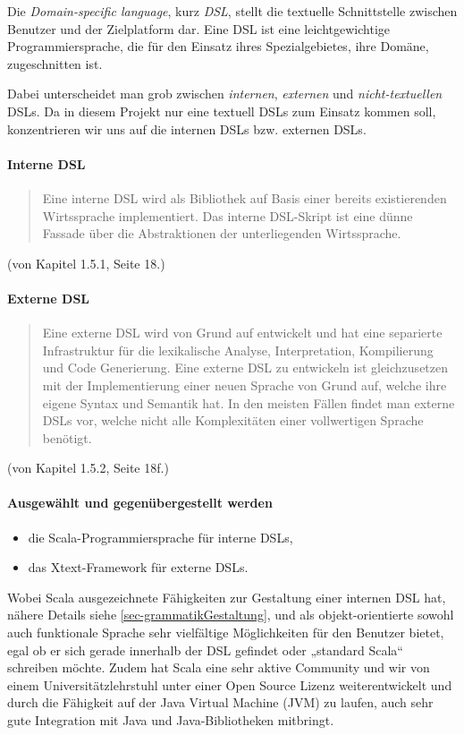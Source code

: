 Die \emph{Domain-specific language}, kurz \emph{DSL}, stellt die
textuelle Schnittstelle zwischen Benutzer und der Zielplatform dar.
Eine DSL ist eine leichtgewichtige Programmiersprache, die für den
Einsatz ihres Spezialgebietes, ihre Domäne, zugeschnitten ist.

Dabei unterscheidet man grob zwischen \emph{internen}, \emph{externen}
und \emph{nicht-textuellen} DSLs.\cite{dsls} Da in diesem Projekt
nur eine textuell DSLs zum Einsatz kommen soll, konzentrieren wir uns
auf die internen DSLs bzw. externen DSLs.

\paragraph{Interne DSL}
\begin{quote}
Eine interne DSL wird als Bibliothek auf Basis
einer bereits existierenden Wirtssprache implementiert. Das interne DSL-Skript
ist eine dünne Fassade über die Abstraktionen der unterliegenden Wirtssprache.
\end{quote} (von \cite{dsls} Kapitel 1.5.1, Seite 18.)

\paragraph{Externe DSL}
\begin{quote}
Eine externe DSL wird von Grund auf entwickelt und hat eine separierte
Infrastruktur für die lexikalische Analyse, Interpretation, Kompilierung
und Code Generierung. Eine externe DSL zu entwickeln ist gleichzusetzen mit
der Implementierung einer neuen Sprache von Grund auf, welche ihre eigene
Syntax und Semantik hat.
In den meisten Fällen findet man externe DSLs vor, welche nicht alle
Komplexitäten einer vollwertigen Sprache benötigt.
\end{quote} (von \cite{dsls} Kapitel 1.5.2, Seite 18f.)

\paragraph{Ausgewählt und gegenübergestellt werden}

\begin{itemize}
  \item die Scala-Programmiersprache für interne DSLs,
  \item das Xtext-Framework für externe DSLs.
\end{itemize}

Wobei Scala ausgezeichnete Fähigkeiten zur Gestaltung einer
internen DSL hat, nähere Details siehe \ref{sec-grammatikGestaltung},
und als objekt-orientierte sowohl auch funktionale Sprache sehr
vielfältige Möglichkeiten für den Benutzer bietet, egal ob er sich
gerade innerhalb der DSL gefindet oder „standard Scala“ schreiben
möchte. Zudem hat Scala eine sehr aktive Community und wir von einem
Universitätzlehrstuhl unter einer Open Source Lizenz weiterentwickelt
und durch die Fähigkeit auf der Java Virtual Machine (JVM) zu laufen,
auch sehr gute Integration mit Java und Java-Bibliotheken mitbringt.

